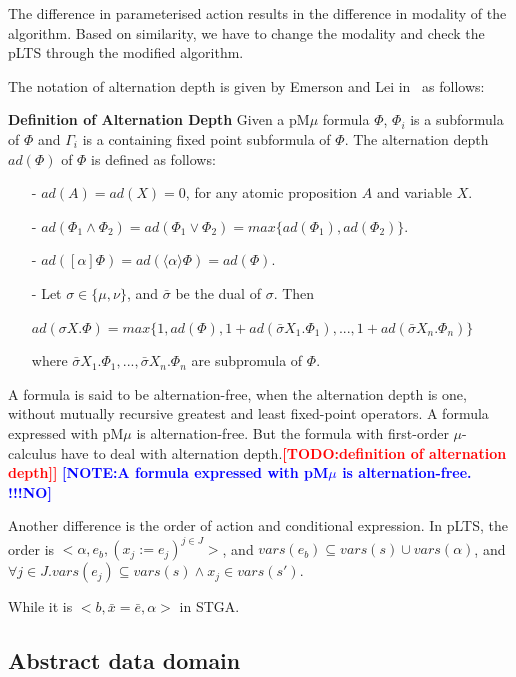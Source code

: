 \documentclass[runningheads,a4paper]{llncs}
\newcommand{\TODO}[1]{\textcolor{red}{\textbf{[TODO:#1]}}}
\newcommand{\NOTE}[1]{\textcolor{blue}{\textbf{[NOTE:#1]}}}
\begin{document}
The difference in parameterised action results in the difference in modality of the algorithm. Based on similarity, we have to change the modality and check the pLTS through the modified algorithm.  

The notation of alternation depth is given by Emerson and Lei in~\cite{emerson1986alternation} as follows:

\textbf{Definition of Alternation Depth}
Given a pM$\mu$ formula $\Phi$, $\Phi_{i}$ is a subformula of $\Phi$ and $\Gamma_{i}$ is a containing fixed point subformula of $\Phi$. The alternation depth $ad(\Phi)$ of $\Phi$ is defined as follows:

\begin{itemize}
\item[-] $ad(A) = ad(X) = 0$, for any atomic proposition $A$ and variable $X$.
\item[-] $ad(\Phi_{1}\wedge\Phi_{2}) = ad(\Phi_{1}\vee\Phi_{2}) = max\{ ad(\Phi_{1}), ad(\Phi_{2})\}$.
\item[-] $ad([\alpha]\Phi) = ad(\langle\alpha\rangle\Phi) = ad(\Phi)$.
\item[-] Let $\sigma\in\{\mu,\nu\}$, and $\bar{\sigma}$ be the dual of $\sigma$. Then
	\begin{center}
	$ad(\sigma X.\Phi) = max\{1, ad(\Phi), 1+ad(\bar{\sigma} X_{1}.\Phi_{1}), ... , 1+ ad(\bar{\sigma} X_{n}.\Phi_{n})\}$
	\end{center} 
	where $\bar{\sigma} X_{1}.\Phi_{1}, ... , \bar{\sigma} X_{n}.\Phi_{n}$ are subpromula of $\Phi$.
\end{itemize}

A formula is said to be alternation-free, when the alternation depth is one, without mutually recursive greatest and least fixed-point operators. A formula expressed with pM$\mu$ is alternation-free. But the formula with first-order $\mu$-calculus have to deal with alternation depth.\TODO{definition of alternation depth]}
\NOTE{A formula expressed with pM$\mu$ is alternation-free. !!!NO}

 {\color{red}{The order of action and conditional expression???}}
Another difference is the order of action and conditional expression. In pLTS, the order is $<\alpha, e_{b}, (x_{j}:=e_{j})^{j\in J}>$,  and $vars(e_{b})\subseteq vars(s)\cup vars(\alpha)$, and $\forall j\in J. vars(e_{j})\subseteq vars(s)\wedge x_{j}\in vars(s')$. 

While it is $< b, \bar{x}=\bar{e}, \alpha>$ in STGA.


\subsection{Abstract data domain}
\end{document}
